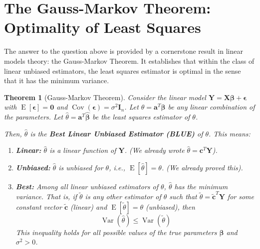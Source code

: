 \documentclass[11pt]{article}
\theoremstyle{mytheoremstyle}
\newtheorem{theorem}{Theorem}[section]
\theoremstyle{mydefinitionstyle}
\newcommand{\vect}[1]{\mathbf{#1}}
\DeclareMathOperator{\E}{E}
\DeclareMathOperator{\Var}{Var}
\DeclareMathOperator{\Cov}{Cov}
\begin{document}
\section{The Gauss-Markov Theorem: Optimality of Least Squares}

The answer to the question above is provided by a cornerstone result in linear models theory: the Gauss-Markov Theorem. It establishes that within the class of linear unbiased estimators, the least squares estimator is optimal in the sense that it has the minimum variance.

\begin{theorem}[Gauss-Markov Theorem]
Consider the linear model $\vect{Y} = \vect{X}\vect{\beta} + \vect{\epsilon}$ with $\E[\vect{\epsilon}] = \vect{0}$ and $\Cov(\vect{\epsilon}) = \sigma^2 \vect{I}_n$. Let $\theta = \vect{a}^T \vect{\beta}$ be any linear combination of the parameters. Let $\hat{\theta} = \vect{a}^T \hat{\vect{\beta}}$ be the least squares estimator of $\theta$.

Then, $\hat{\theta}$ is the \textbf{Best Linear Unbiased Estimator (BLUE)} of $\theta$. This means:
\begin{enumerate}
    \item \textbf{Linear:} $\hat{\theta}$ is a linear function of $\vect{Y}$. (We already wrote $\hat{\theta} = \vect{c}^T \vect{Y}$).
    \item \textbf{Unbiased:} $\hat{\theta}$ is unbiased for $\theta$, i.e., $\E[\hat{\theta}] = \theta$. (We already proved this).
    \item \textbf{Best:} Among all linear unbiased estimators of $\theta$, $\hat{\theta}$ has the minimum variance. That is, if $\tilde{\theta}$ is any other estimator of $\theta$ such that $\tilde{\theta} = \tilde{\vect{c}}^T \vect{Y}$ for some constant vector $\tilde{\vect{c}}$ (linear) and $\E[\tilde{\theta}] = \theta$ (unbiased), then
        \begin{equation*}
        \Var(\hat{\theta}) \le \Var(\tilde{\theta})
        \end{equation*}
        This inequality holds for all possible values of the true parameters $\vect{\beta}$ and $\sigma^2 > 0$.
\end{enumerate}
\end{theorem}
\end{document}
